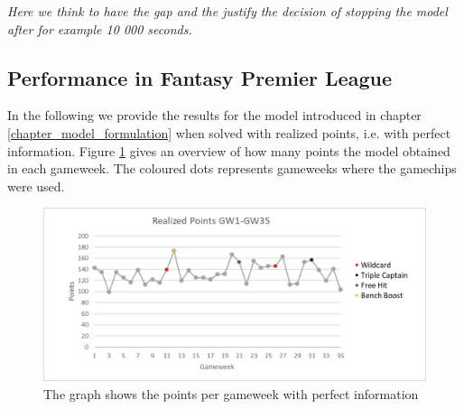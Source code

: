 \textit{Here we think to have the gap and the justify the decision of stopping the model after for example 10 000 seconds.}

\subsection{Performance in Fantasy Premier League}
In the following we provide the results for the model introduced in chapter \ref{chapter_model_formulation} when solved with realized points, i.e. with perfect information. Figure \ref{Figure_Realized_points} gives an overview of how many points the model obtained in each gameweek. The coloured dots represents gameweeks where the gamechips were used. 

\begin{figure}[H]
\label{fig:Realized_points}
    \centering
    \includegraphics[scale=0.75]{fig/chapter_7/RealizedPoints_colour.png}
    \caption{The graph shows the points per gameweek with perfect information}
\label{Figure_Realized_points}    
\end{figure}


